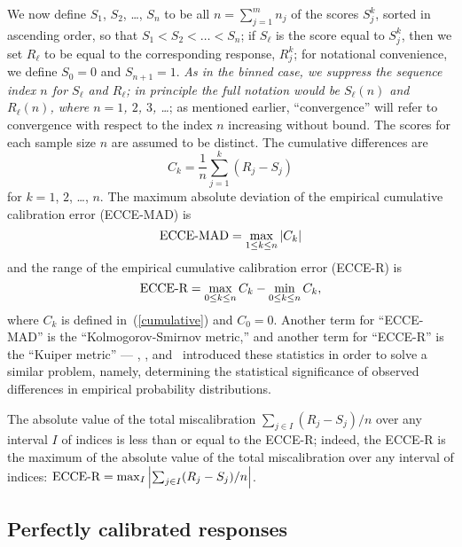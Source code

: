 \documentclass{article}
\begin{document}
We now define $S_1$, $S_2$, \dots, $S_n$ to be all $n = \sum_{j=1}^m n_j$
of the scores $S_j^k$, sorted in ascending order, so that
$S_1 < S_2 < \dots < S_n$; if $S_\ell$ is the score equal to $S_j^k$,
then we set $R_\ell$ to be equal to the corresponding response, $R_j^k$;
for notational convenience, we define $S_0 = 0$ and $S_{n+1} = 1$.
{\it As in the binned case, we suppress the sequence index $n$
for $S_\ell$ and $R_\ell$; in principle the full notation would be
$S_\ell(n)$ and $R_\ell(n)$, where $n = 1$, $2$, $3$, \dots};
as mentioned earlier, ``convergence'' will refer to convergence
with respect to the index $n$ increasing without bound. 
The scores for each sample size $n$ are assumed to be distinct.
The cumulative differences are
%
\begin{equation}
\label{cumulative}
C_k = \frac{1}{n} \sum_{j=1}^k (R_j - S_j)
\end{equation}
%
for $k = 1$, $2$, \dots, $n$.
The maximum absolute deviation of the empirical cumulative calibration error
(ECCE-MAD) is
%
\begin{equation}
\label{ks}
\hbox{ECCE-MAD} = \max_{1 \le k \le n} |C_k|
\end{equation}
%
and the range of the empirical cumulative calibration error (ECCE-R) is
%
\begin{equation}
\label{ku}
\hbox{ECCE-R} = \max_{0 \le k \le n} C_k - \min_{0 \le k \le n} C_k,
\end{equation}
%
where $C_k$ is defined in~(\ref{cumulative}) and $C_0 = 0$.
Another term for ``ECCE-MAD'' is the ``Kolmogorov-Smirnov metric,''
and another term for ``ECCE-R'' is the ``Kuiper metric'' ---
\cite{Kolmogorov}, \cite{Smirnov}, and~\cite{Kuiper} introduced
these statistics in order to solve a similar problem, namely,
determining the statistical significance of observed differences
in empirical probability distributions.

The absolute value of the total miscalibration
$\sum_{j \in I} (R_j - S_j)/n$
over any interval $I$ of indices is less than or equal to the ECCE-R;
indeed, the ECCE-R is the maximum of the absolute value
of the total miscalibration over any interval of indices:
$\hbox{ECCE-R} = \max_I \left| \sum_{j \in I} (R_j - S_j)/n \right|$.



\subsection{Perfectly calibrated responses}
\label{perfectsub}
\end{document}
